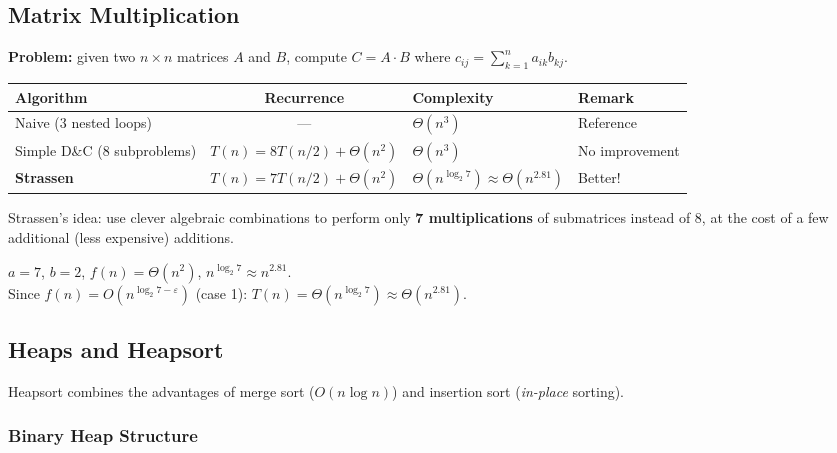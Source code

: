 \subsection{Matrix Multiplication}

\textbf{Problem:} given two $n \times n$ matrices $A$ and $B$, compute
$C = A \cdot B$ where $c_{ij} = \sum_{k=1}^n a_{ik} b_{kj}$.

\begin{center}
\renewcommand{\arraystretch}{1.3}
\begin{tabular}{lcll}
\toprule
\textbf{Algorithm} & \textbf{Recurrence} & \textbf{Complexity} & \textbf{Remark} \\
\midrule
Naive (3 nested loops)
  & --- & $\Theta(n^3)$ & Reference \\
Simple D\&C (8 subproblems)
  & $T(n) = 8T(n/2) + \Theta(n^2)$
  & $\Theta(n^3)$ & No improvement \\
\textbf{Strassen}
  & $T(n) = 7T(n/2) + \Theta(n^2)$
  & $\Theta(n^{\log_2 7}) \approx \Theta(n^{2.81})$ & Better! \\
\bottomrule
\end{tabular}
\end{center}

Strassen's idea: use clever algebraic combinations to perform only
\textbf{7 multiplications} of submatrices instead of 8, at the cost of a few
additional (less expensive) additions.

\begin{tcolorbox}[colback=lightblue, colframe=keyblue, fonttitle=\bfseries,
                  title={Applying the Master Theorem to Strassen}]
$a=7$, $b=2$, $f(n)=\Theta(n^2)$, $n^{\log_2 7} \approx n^{2.81}$.\\
Since $f(n) = O(n^{\log_2 7 - \varepsilon})$ (case 1):
$T(n) = \Theta(n^{\log_2 7}) \approx \Theta(n^{2.81})$.
\end{tcolorbox}

\subsection{Heaps and Heapsort}

Heapsort combines the advantages of merge sort ($O(n\log n)$) and insertion sort
(\emph{in-place} sorting).

\subsubsection{Binary Heap Structure}

